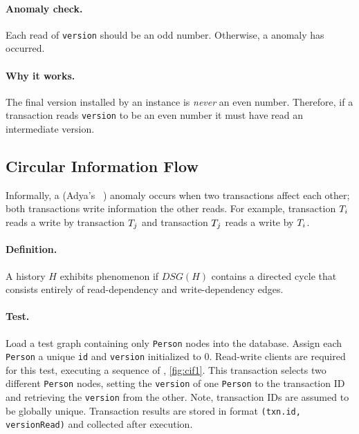 \paragraph{Anomaly check.}
Each read of \texttt{version} should be an odd number.
Otherwise, a  anomaly has occurred.

\paragraph{Why it works.}
The final version installed by an  instance is \emph{never} an even number.
Therefore, if a transaction reads \texttt{version} to be an even number it must have read an intermediate version.

\subsection*{Circular Information Flow}

Informally, a  (Adya's ~\cite{adya1999weak}) anomaly occurs when two transactions affect each other; \ie both transactions write information the other reads.
For example, transaction $T_i$ reads a write by transaction $T_j$ and transaction $T_j$ reads a write by $T_i$.

\paragraph{Definition.}
A history $H$ exhibits phenomenon  if $\textit{DSG}(H)$ contains a directed cycle that consists entirely of read-dependency and write-dependency edges.

\paragraph{Test.}
Load a test graph containing only \texttt{Person} nodes into the database.
Assign each \texttt{Person} a unique \texttt{id} and \texttt{version} initialized to 0.
Read-write clients are required for this test, executing a sequence of , \autoref{fig:cif1}.
This transaction selects two different \texttt{Person} nodes, setting the \texttt{version} of one \texttt{Person} to the transaction ID and retrieving the \texttt{version} from the other.
Note, transaction IDs are assumed to be globally unique.
Transaction results are stored in format \texttt{(txn.id, versionRead)} and collected after execution.

